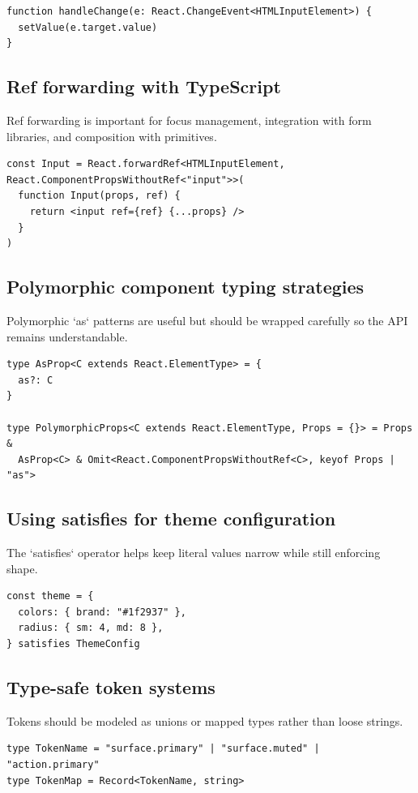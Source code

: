 \begin{verbatim}
function handleChange(e: React.ChangeEvent<HTMLInputElement>) {
  setValue(e.target.value)
}
\end{verbatim}

\subsection{Ref forwarding with TypeScript}
Ref forwarding is important for focus management, integration with form libraries, and composition with primitives.

\begin{verbatim}
const Input = React.forwardRef<HTMLInputElement, React.ComponentPropsWithoutRef<"input">>(
  function Input(props, ref) {
    return <input ref={ref} {...props} />
  }
)
\end{verbatim}

\subsection{Polymorphic component typing strategies}
Polymorphic `as` patterns are useful but should be wrapped carefully so the API remains understandable.

\begin{verbatim}
type AsProp<C extends React.ElementType> = {
  as?: C
}

type PolymorphicProps<C extends React.ElementType, Props = {}> = Props &
  AsProp<C> & Omit<React.ComponentPropsWithoutRef<C>, keyof Props | "as">
\end{verbatim}

\subsection{Using satisfies for theme configuration}
The `satisfies` operator helps keep literal values narrow while still enforcing shape.

\begin{verbatim}
const theme = {
  colors: { brand: "#1f2937" },
  radius: { sm: 4, md: 8 },
} satisfies ThemeConfig
\end{verbatim}

\subsection{Type-safe token systems}
Tokens should be modeled as unions or mapped types rather than loose strings.

\begin{verbatim}
type TokenName = "surface.primary" | "surface.muted" | "action.primary"
type TokenMap = Record<TokenName, string>
\end{verbatim}

